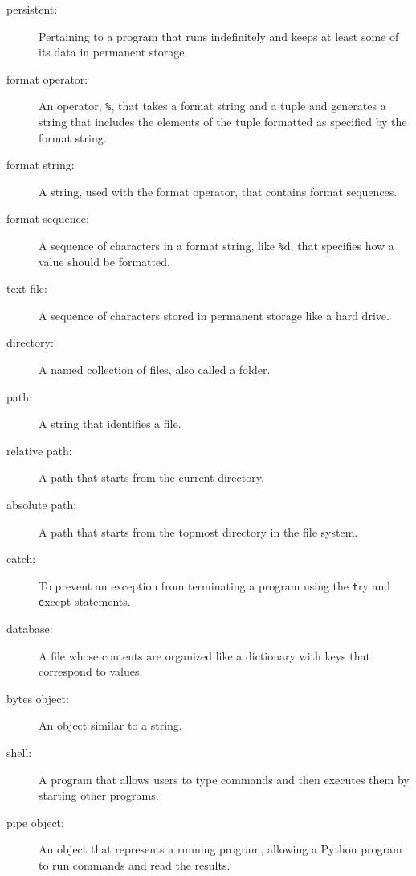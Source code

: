 \documentclass[
DIV=11,
fontsize=13,
twoside,
headinclude=false,
titlepage=firstiscover,
abstract=true,
headsepline=true,
footsepline=true,
chapterprefix=true, %
headings=big,
bibliography=totoc,%
captions=tableheading
]{scrbook}
\theoremstyle{definition}
\begin{document}
\begin{description}

\item[persistent:] Pertaining to a program that runs indefinitely
and keeps at least some of its data in permanent storage.

\item[format operator:] An operator, {\texttt \%}, that takes a format
string and a tuple and generates a string that includes
the elements of the tuple formatted as specified by the format string.

\item[format string:] A string, used with the format operator, that
contains format sequences.  

\item[format sequence:] A sequence of characters in a format string,
like {\texttt \%d}, that specifies how a value should be formatted.

\item[text file:] A sequence of characters stored in permanent
storage like a hard drive.

\item[directory:] A named collection of files, also called a folder.

\item[path:] A string that identifies a file.

\item[relative path:] A path that starts from the current directory.

\item[absolute path:] A path that starts from the topmost directory
in the file system.

\item[catch:] To prevent an exception from terminating
a program using the {\texttt try}
and {\texttt except} statements.

\item[database:] A file whose contents are organized like a dictionary
with keys that correspond to values.

\item[bytes object:] An object similar to a string.

\item[shell:] A program that allows users to type commands and then
executes them by starting other programs.

\item[pipe object:] An object that represents a running program, allowing
a Python program to run commands and read the results.

\end{description}
\end{document}
